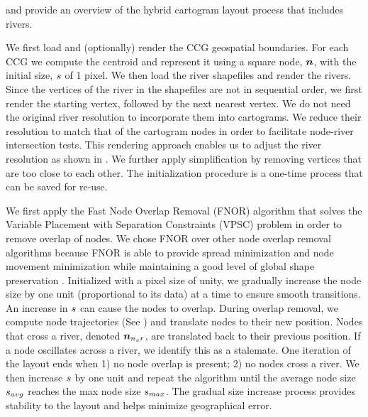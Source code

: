 and  provide an overview of the hybrid cartogram layout process that includes rivers.

 We first load and (optionally) render the CCG geospatial boundaries. For each CCG we compute the centroid and represent it using a square node, $ \bm{n} $, with the initial size, $ s $ of 1 pixel. We then load the river shapefiles and render the rivers. Since the vertices of the river in the shapefiles are not in sequential order, we first render the starting vertex, followed by the next nearest vertex. We do not need the original river resolution to incorporate them into cartograms. We reduce their resolution to match that of the cartogram nodes in order to facilitate node-river intersection tests. This rendering approach enables us to adjust the river resolution as shown in . We further apply simplification by removing vertices that are too close to each other. The initialization procedure is a one-time process that can be saved for re-use.


 We first apply the Fast Node Overlap Removal (FNOR) algorithm that solves the Variable Placement with Separation Constraints (VPSC) problem \cite{dwyer2006Fast} in order to remove overlap of nodes. We chose FNOR over other node overlap removal algorithms because FNOR is able to provide spread minimization and node movement minimization while maintaining a good level of global shape preservation \cite{chen2020Node}. Initialized with a pixel size of unity, we gradually increase the node size by one unit (proportional to its data) at a time to ensure smooth transitions. An increase in $ s $ can cause the nodes to overlap. During overlap removal, we compute node trajectories (See ) and translate nodes to their new position. Nodes that cross a river, denoted $ \bm{n}_{n_{x}r} $, are translated back to their previous position. If a node oscillates across a river, we identify this as a stalemate. One iteration of the layout ends when 1) no node overlap is present; 2) no nodes cross a river. We then increase $ s $ by one unit and repeat the algorithm until the average node size $ s_{avg} $ reaches the max node size $ s_{max} $. The gradual size increase process provides stability to the layout and helps minimize geographical error.

